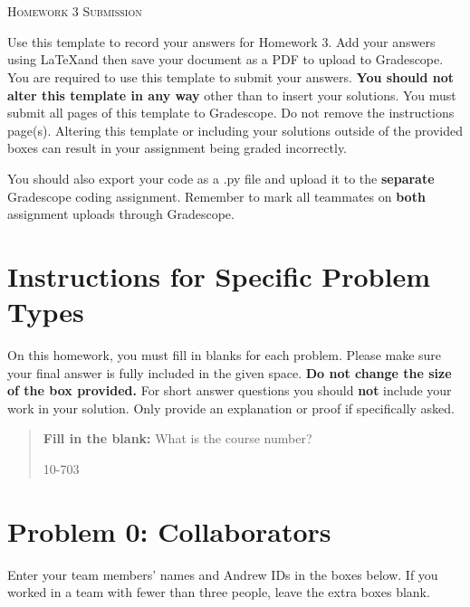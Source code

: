 \documentclass[12pt]{article}
\begin{document}
\section*{}
\begin{center}
  \centerline{\textsc{\LARGE  Homework 3 Submission}}
\end{center}

Use this template to record your answers for Homework 3.  Add your answers using \LaTeX and then save your document as a PDF to upload to Gradescope.  You are required to use this template to submit your answers.  \textbf{You should not alter this template in any way} other than to insert your solutions.  You must submit all \pageref{LastPage} pages of this template to Gradescope.  Do not remove the instructions page(s).  Altering this template or including your solutions outside of the provided boxes can result in your assignment being graded incorrectly.

You should also export your code as a .py file and upload it to the \textbf{separate} Gradescope coding assignment. Remember to mark all teammates on \textbf{both} assignment uploads through Gradescope.

\section*{Instructions for Specific Problem Types}

On this homework, you must fill in blanks for each problem. Please make sure your final answer is fully included in the given space.  \textbf{Do not change the size of the box provided.}  For short answer questions you should \textbf{not} include your work in your solution.  Only provide an explanation or proof if specifically asked.

\begin{quote}
\textbf{Fill in the blank:} What is the course number?

\begin{tcolorbox}[fit,height=1cm, width=4cm, blank, borderline={1pt}{-2pt},nobeforeafter]
    \begin{center}\huge10-703\end{center}
    \end{tcolorbox}
\end{quote}

\newpage

\section*{Problem 0: Collaborators}
Enter your team members' names and Andrew IDs in the boxes below. If you worked in a team with fewer than three people, leave the extra boxes blank.
\end{document}
